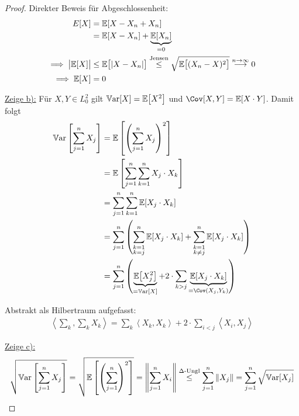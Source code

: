 \documentclass[12pt,a4paper]{article}
\begin{document}
\begin{proof}
Direkter Beweis für Abgeschlossenheit:
\begin{align*}
E[X]
&=\mathbb{E}[X-X_n+X_n]\\ 
&=\mathbb{E}[X-X_n]+\underbrace{\mathbb{E}[X_n]}_{=0}\\
\implies
\big|\mathbb{E}[X]\big|&\leq \mathbb{E}\big[|X-X_n|\big]
\stackrel{\text{Jensen}}{\leq}
\sqrt{\mathbb{E}\big[(X_n-X)^2\big]}
\stackrel{n\to\infty}{\longrightarrow} 0\\
\implies
\mathbb{E}[X]&=0
\end{align*}

\underline{Zeige b):} Für $X,Y\in L_0^2$ gilt $\mathbb{V}\text{ar}[X]=\mathbb{E}\big[X^2\big]$ und $\Cov[X,Y]=\E[X\cdot Y]$. Damit folgt
\begin{align*}
\Var\left[\sum\limits_{j=1}^n X_j\right]
&=\E\left[\left(\sum\limits_{j=1}^n X_j\right)^2\right]\\
&=\E\left[\sum\limits_{j=1}^n\sum\limits_{k=1}^n X_j\cdot X_k\right]\\
&=\sum\limits_{j=1}^n\sum\limits_{k=1}^n \E[X_j\cdot X_k]\\
&=\sum\limits_{j=1}^n\left(
\sum\limits_{\begin{subarray}{c}k=1\\ k=j\end{subarray}}^n \E[X_j\cdot X_k]
+\sum\limits_{\begin{subarray}{c}k=1\\ k\neq j\end{subarray}}^n \E[X_j\cdot X_k]\right)\\
&=\sum\limits_{j=1}^n\left(\underbrace{\E\big[X_j^2\big]}_{=\Var[X]}+2\cdot\sum\limits_{k>j}\underbrace{\E[X_j\cdot X_k]}_{=\Cov(X_j,Y_k)}\right)
\end{align*}

Abstrakt als Hilbertraum aufgefasst:
\begin{align*}
\left\langle\sum\limits_{k},\sum\limits_{k} X_k\right\rangle
=\sum\limits_k\left\langle X_k,X_k\right\rangle+2\cdot\sum\limits_{i<j}\left\langle X_i,X_j\right\rangle
\end{align*}

\underline{Zeige c):}\\
\begin{align*}
\sqrt{\mathbb{V}\text{ar}\left[\sum\limits_{j=1}^n X_j\right]}
=\sqrt{\mathbb{E}\left[\left(\sum\limits_{j=1}^n\right)^2\right]}
=\left\Vert\sum\limits_{j=1}^n X_i\right\Vert
\stackrel{\Delta\text{-Ungl}}{\leq}
\sum\limits_{j=1}^n\Vert X_j\Vert
=\sum\limits_{j=1}^n\sqrt{\mathbb{V}\text{ar}[X_j]}
\end{align*}
\end{proof}
\end{document}
